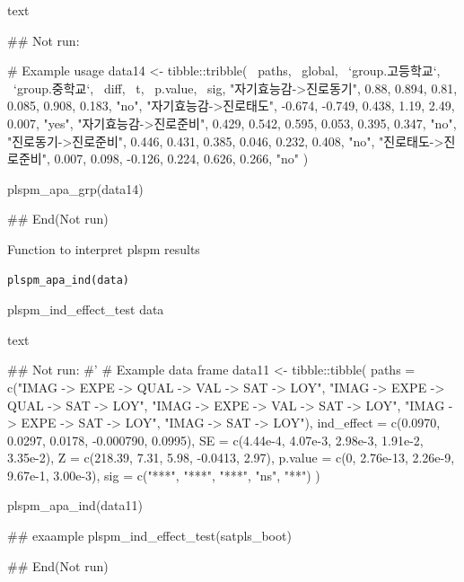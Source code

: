 \documentclass[a4paper]{book}
\begin{document}
%
\begin{Value}
text
\end{Value}
%
\begin{Examples}
\begin{ExampleCode}

## Not run: 

# Example usage
data14 <- tibble::tribble(
  ~paths, ~global, ~`group.고등학교`, ~`group.중학교`, ~diff, ~t, ~p.value, ~sig,
  "자기효능감->진로동기", 0.88, 0.894, 0.81, 0.085, 0.908, 0.183, "no",
  "자기효능감->진로태도", -0.674, -0.749, 0.438, 1.19, 2.49, 0.007, "yes",
  "자기효능감->진로준비", 0.429, 0.542, 0.595, 0.053, 0.395, 0.347, "no",
  "진로동기->진로준비", 0.446, 0.431, 0.385, 0.046, 0.232, 0.408, "no",
  "진로태도->진로준비", 0.007, 0.098, -0.126, 0.224, 0.626, 0.266, "no"
)

plspm_apa_grp(data14)


## End(Not run)

\end{ExampleCode}
\end{Examples}
%
\begin{Description}
Function to interpret plspm results
\end{Description}
%
\begin{Usage}
\begin{verbatim}
plspm_apa_ind(data)
\end{verbatim}
\end{Usage}
%
\begin{Arguments}
\begin{ldescription}
\item[\code{data}] plspm\_ind\_effect\_test data
\end{ldescription}
\end{Arguments}
%
\begin{Value}
text
\end{Value}
%
\begin{Examples}
\begin{ExampleCode}

## Not run: 
#'
# Example data frame
data11 <- tibble::tibble(
  paths = c("IMAG -> EXPE -> QUAL -> VAL -> SAT -> LOY",
            "IMAG -> EXPE -> QUAL -> SAT -> LOY",
            "IMAG -> EXPE -> VAL -> SAT -> LOY",
            "IMAG -> EXPE -> SAT -> LOY",
            "IMAG -> SAT -> LOY"),
  ind_effect = c(0.0970, 0.0297, 0.0178, -0.000790, 0.0995),
  SE = c(4.44e-4, 4.07e-3, 2.98e-3, 1.91e-2, 3.35e-2),
  Z = c(218.39, 7.31, 5.98, -0.0413, 2.97),
  p.value = c(0, 2.76e-13, 2.26e-9, 9.67e-1, 3.00e-3),
  sig = c("***", "***", "***", "ns", "**")
)

plspm_apa_ind(data11)

## exaample
plspm_ind_effect_test(satpls_boot)%


## End(Not run)
\end{ExampleCode}
\end{Examples}
\end{document}
